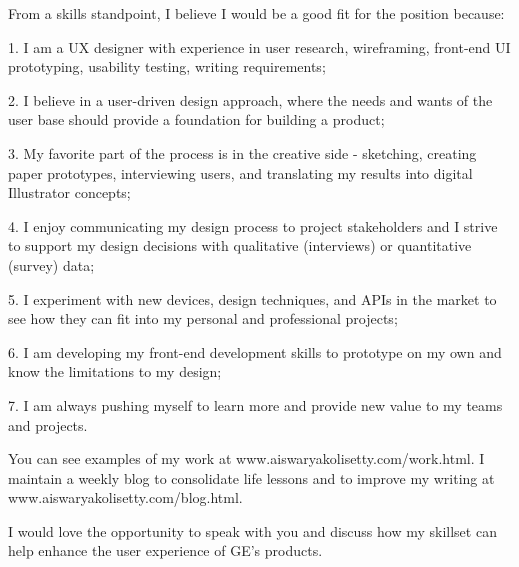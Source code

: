 \documentclass[10pt,a4paper,sans]{moderncv}        %
\begin{document}
 From a skills standpoint, I believe I would be a good fit for the position because:


1. I am a UX designer with experience in user research, wireframing, front-end UI prototyping, usability testing, writing requirements;

2. I believe in a user-driven design approach, where the needs and wants of the user base should provide a foundation for building a product;

3.  My favorite part of the process is in the creative side - sketching, creating paper prototypes, interviewing users, and translating my results into digital Illustrator concepts;

4. I enjoy communicating my design process to project stakeholders and I strive to support my design decisions with qualitative (interviews) or quantitative (survey) data;

5. I experiment with new devices, design techniques, and APIs in the market to see how they can fit into my personal and professional projects;

6. I am developing my front-end development skills to prototype on my own and  know the limitations to my design;

7. I am always pushing myself to learn more and provide new value to my teams and projects.

\bigskip

You can see examples of my work at www.aiswaryakolisetty.com/work.html.  I maintain a weekly blog to consolidate life lessons and to improve my writing at www.aiswaryakolisetty.com/blog.html.    

I would love the opportunity to speak with you and discuss how my skillset can help enhance the user experience of GE's products.


\bigskip

\makeletterclosing

\end{document}
